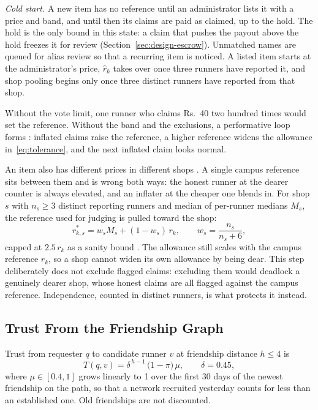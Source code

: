 \documentclass[journal]{IEEEtran}
\begin{document}
\emph{Cold start.} A new item has no reference until an administrator lists it with
a price and band, and until then its claims are paid as claimed, up to the hold. The
hold is the only bound in this state: a claim that pushes the payout above the hold
freezes it for review (Section~\ref{sec:design-escrow}). Unmatched names are queued
for alias review so that a recurring item is noticed. A listed item starts at the
administrator's price, $\hat r_k$ takes over once three runners have reported it, and
shop pooling begins only once three distinct runners have reported from that shop.

Without the vote limit, one runner who claims Rs.~40 two hundred times would set the
reference. Without the band and the exclusions, a performative loop forms
\cite{perdomo2020performative}: inflated claims raise the reference, a higher reference
widens the allowance in~\eqref{eq:tolerance}, and the next inflated claim looks
normal.

An item also has different prices in different shops \cite{lin2018domain}. A single
campus reference sits between them and is wrong both ways: the honest runner at the
dearer counter is always elevated, and an inflater at the cheaper one blends in. For
shop $s$ with $n_s\ge3$ distinct reporting runners and median of per-runner medians
$M_s$, the reference used for judging is pulled toward the shop:
\begin{equation}
r^*_{k,s} = w_s M_s + (1-w_s)\,r_k,\qquad w_s = \frac{n_s}{n_s+6}, \label{eq:store}
\end{equation}
capped at $2.5\,r_k$ as a sanity bound \cite{efron1975data}. The
allowance still scales with the campus reference $r_k$, so a shop cannot widen its own
allowance by being dear. This step deliberately does not exclude flagged claims:
excluding them would deadlock a genuinely dearer shop, whose honest claims are all
flagged against the campus reference. Independence, counted in distinct runners,
is what protects it instead.

\subsection{Trust From the Friendship Graph}\label{sec:design-trust}
Trust from requester $q$ to candidate runner $v$ at friendship distance $h\le4$ is
\begin{equation}
T(q,v) = \delta^{\,h-1}\,\bigl(1-\pi\bigr)\,\mu,\qquad \delta = 0.45, \label{eq:trust}
\end{equation}
where $\mu\in[0.4,1]$ grows linearly to 1 over the first 30 days of the newest
friendship on the path, so that a network recruited yesterday counts for less than
an established one. Old friendships are not discounted.
\end{document}
